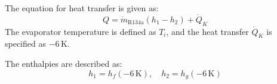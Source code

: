 The equation for heat transfer is given as:  
\[
Q = \dot{m}_{\text{R134a}} (h_1 - h_2) + \dot{Q}_K
\]  
The evaporator temperature is defined as \( T_i \), and the heat transfer \( \dot{Q}_K \) is specified as \( -6 \, \text{K} \).  

The enthalpies are described as:  
\[
h_1 = h_f(-6 \, \text{K}), \quad h_2 = h_g(-6 \, \text{K})
\]